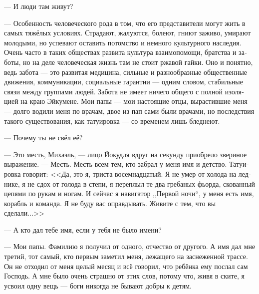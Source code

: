 \documentclass[a4paper,12pt,fleqn]{book}\usepackage{polyglossia}\setdefaultlanguage[babelshorthands=true]{russian}\setotherlanguage{english}\defaultfontfeatures{Ligatures=TeX,Mapping=tex-text}\usepackage{xcolor}\newcommand{\ml}[3]{#2}
\begin{document}
--- И люди там живут?

--- Особенность человеческого рода в том, что его представители могут жить в самых тяжёлых условиях.
Страдают, жалуются, болеют, гниют заживо, умирают молодыми, но успевают оставить потомство и немного культурного наследия.
\ml{$0$}
{Очень часто в таких обществах развита культура взаимопомощи, братства и заботы, но на деле человеческая жизнь там не стоит ржавой гайки.}
{Very often such a societies have strong culture of mutual aid, siblinghood, and care, but in fact human life costs cheaper than a rusty wingnut.}
\ml{$0$}
{Оно и понятно, ведь забота --- это развитая медицина, сильные и разнообразные общественные движения, коммуникации, социальные гарантии --- одним словом, стабильные связи между группами людей.}
{That's logical, 'cuz care is about advanced medical facilities, strong and various social movements, communications, social guarantees---in a nutshell, stable connections between human groups.}
\ml{$0$}
{Забота не имеет ничего общего с полной изоляцией на краю Эйкумене.}
{Care has nothing to do with complete isolation at the edge of Ökumene.}
Мои папы --- мои настоящие отцы, вырастившие меня --- долго водили меня по врачам, двое из пап сами были врачами, но последствия такого существования, как татуировка --- со временем лишь бледнеют.

--- Почему ты не свёл её?

--- Это месть, Михаэль, --- лицо Йокудля вдруг на секунду приобрело звериное выражение.
--- Месть.
Месть всем тем, кто забрал у меня имя и детство.
Татуировка говорит: <<Да, это я, триста восемнадцатый.
\ml{$0$}
{Я не умер от холода на леднике, я не сдох от голода в степи, я переплыл те два гребаных фьорда, скованный цепями по рукам и ногам.}
{I haven't frozen dead on the glacier, I haven't died of starvation on the grassland, I have crossed those two fucking fjorde with chains on my limbs.}
И сейчас я навигатор ,,Первой ночи``, у меня есть имя, корабль и команда.
\ml{$0$}
{Я не буду вас оправдывать.}
{I won't justify y'all.}
\ml{$0$}
{Живите с тем, что вы сделали...>>}
{Live with what you've done ....' ''}

--- А кто дал тебе имя, если у тебя не было имени?

--- Мои папы.
Фамилию я получил от одного, отчество от другого.
А имя дал мне третий, тот самый, кто первым заметил меня, лежащего на заснеженной трассе.
Он не отходил от меня целый месяц и всё говорил, что ребёнка ему послал сам Господь.
А мне было очень страшно от этих слов, потому что, живя в ските, я усвоил одну вещь --- боги никогда не бывают добры к детям.
\end{document}

